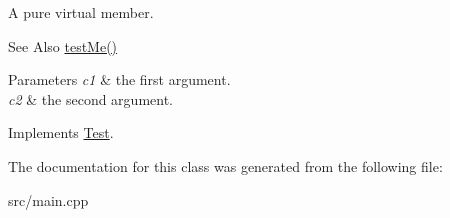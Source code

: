 A pure virtual member. 

\begin{DoxySeeAlso}{See Also}
\hyperlink{classTest_af7115d71dda64654a7104c24f130e8d0}{test\-Me()} 
\end{DoxySeeAlso}

\begin{DoxyParams}{Parameters}
{\em c1} & the first argument. \\
\hline
{\em c2} & the second argument. \\
\hline
\end{DoxyParams}


Implements \hyperlink{classTest_a3edb9fdc1e9f0d5274b57386ab03704c}{Test}.



The documentation for this class was generated from the following file\-:\begin{DoxyCompactItemize}
\item 
src/main.\-cpp\end{DoxyCompactItemize}
